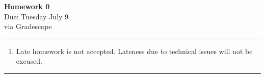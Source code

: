 \documentclass[12pt]{article}
\newif\ifshow
\begin{document}
\begin{center}
\ifshow
  \textbf{\Large Homework 0 Solution}\\
\else
  \textbf{\Large Homework 0}\\
\fi
Due: Tuesday July 9\\via Gradescope\\
\end{center}

\hrule

\vspace{0.2cm}

\begin{enumerate}[$\bullet$]  
\item Late homework is not accepted.  Lateness due to technical issues will not be excused.  
\end{enumerate}

\hrule

\vspace{0.5cm}
\end{document}
